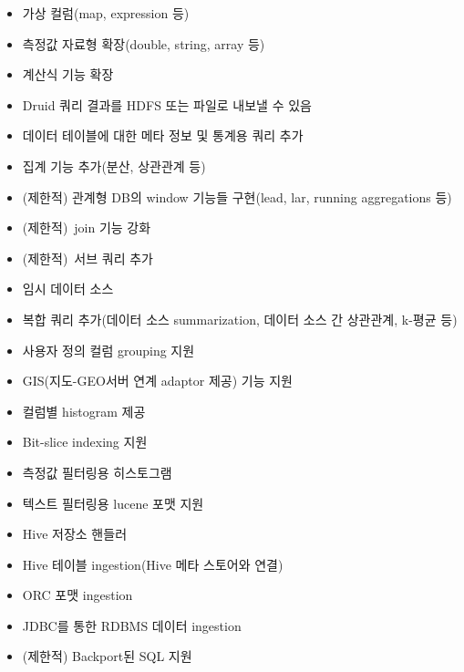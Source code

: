 \documentclass[letterpaper,10pt,english]{sphinxmanual}
\begin{document}
\begin{itemize}
\item {} 
가상 컬럼(map, expression 등)

\item {} 
측정값 자료형 확장(double, string, array 등)

\item {} 
계산식 기능 확장

\item {} 
Druid 쿼리 결과를 HDFS 또는 파일로 내보낼 수 있음

\item {} 
데이터 테이블에 대한 메타 정보 및 통계용 쿼리 추가

\item {} 
집계 기능 추가(분산, 상관관계 등)

\item {} 
(제한적) 관계형 DB의 window 기능들 구현(lead, lar, running aggregations 등)

\item {} 
(제한적) join 기능 강화

\item {} 
(제한적) 서브 쿼리 추가

\item {} 
임시 데이터 소스

\item {} 
복합 쿼리 추가(데이터 소스 summarization, 데이터 소스 간 상관관계, k-평균 등)

\item {} 
사용자 정의 컬럼 grouping 지원

\item {} 
GIS(지도-GEO서버 연계 adaptor 제공) 기능 지원

\item {} 
컬럼별 histogram 제공

\item {} 
Bit-slice indexing 지원

\end{itemize}

\begin{itemize}
\item {} 
측정값 필터링용 히스토그램

\item {} 
텍스트 필터링용 lucene 포맷 지원

\end{itemize}

\begin{itemize}
\item {} 
Hive 저장소 핸들러

\item {} 
Hive 테이블 ingestion(Hive 메타 스토어와 연결)

\item {} 
ORC 포맷 ingestion

\item {} 
JDBC를 통한 RDBMS 데이터 ingestion

\item {} 
(제한적) Backport된 SQL 지원

\end{itemize}
\end{document}
